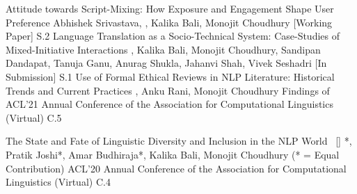 
\begin{publications}
\publication
    {Attitude towards Script-Mixing: How Exposure and Engagement Shape User Preference}{}
    {Abhishek Srivastava, \underline{}, Kalika Bali, Monojit Choudhury}
	{} {[Working Paper]} {S.2}
\publication
    {Language Translation as a Socio-Technical System: Case-Studies of Mixed-Initiative Interactions}{}
    {\underline{}, Kalika Bali, Monojit Choudhury, Sandipan Dandapat, Tanuja Ganu, Anurag Shukla, Jahanvi Shah, Vivek Seshadri}
	{} {[In Submission]} {S.1}
\publication
    {Use of Formal Ethical Reviews in NLP Literature: Historical Trends and Current Practices}{}
    {\underline{}, Anku Rani, Monojit Choudhury}
	{Findings of ACL'21} {Annual Conference of the Association for Computational Linguistics (Virtual)} {C.5}
	
\publication
    {The State and Fate of Linguistic Diversity and Inclusion in the NLP World}{~ [\href{https://www.aclweb.org/anthology/2020.acl-main.560/}{\small{\linkSymbol}}]}
    {\underline{}*, Pratik Joshi*, Amar Budhiraja*, Kalika Bali, Monojit Choudhury \small{(* = Equal Contribution)}}
	{ACL'20} {Annual Conference of the Association for Computational Linguistics (Virtual)} {C.4}

\end{publications}
